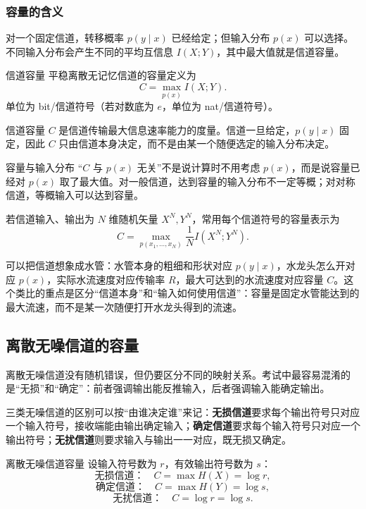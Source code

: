 \subsubsection{容量的含义}
对一个固定信道，转移概率 $p(y\mid x)$ 已经给定；但输入分布 $p(x)$ 可以选择。不同输入分布会产生不同的平均互信息 $I(X;Y)$，其中最大值就是信道容量。

\begin{definitionBox}{信道容量}
平稳离散无记忆信道的容量定义为
\[
C=\max_{p(x)} I(X;Y).
\]
单位为 bit/信道符号（若对数底为 $e$，单位为 nat/信道符号）。
\end{definitionBox}

信道容量 $C$ 是信道传输最大信息速率能力的度量。信道一旦给定，$p(y\mid x)$ 固定，因此 $C$ 只由信道本身决定，而不是由某一个随便选定的输入分布决定。

\begin{warningBox}{容量与输入分布}
“$C$ 与 $p(x)$ 无关”不是说计算时不用考虑 $p(x)$，而是说容量已经对 $p(x)$ 取了最大值。对一般信道，达到容量的输入分布不一定等概；对对称信道，等概输入可以达到容量。
\end{warningBox}

若信道输入、输出为 $N$ 维随机矢量 $X^N,Y^N$，常用每个信道符号的容量表示为
\[
C=\max_{p(x_1,\dots,x_N)}\frac{1}{N}I(X^N;Y^N).
\]

可以把信道想象成水管：水管本身的粗细和形状对应 $p(y\mid x)$，水龙头怎么开对应 $p(x)$，实际水流速度对应传输率 $R$，最大可达到的水流速度对应容量 $C$。这个类比的重点是区分“信道本身”和“输入如何使用信道”：容量是固定水管能达到的最大流速，而不是某一次随便打开水龙头得到的流速。

\subsection{离散无噪信道的容量}

离散无噪信道没有随机错误，但仍要区分不同的映射关系。考试中最容易混淆的是“无损”和“确定”：前者强调输出能反推输入，后者强调输入能确定输出。

三类无噪信道的区别可以按“由谁决定谁”来记：\textbf{无损信道}要求每个输出符号只对应一个输入符号，接收端能由输出确定输入；\textbf{确定信道}要求每个输入符号只对应一个输出符号；\textbf{无扰信道}则要求输入与输出一一对应，既无损又确定。

\begin{formulaBox}{离散无噪信道容量}
设输入符号数为 $r$，有效输出符号数为 $s$：
\[
\text{无损信道：}\quad C=\max H(X)=\log r,
\]
\[
\text{确定信道：}\quad C=\max H(Y)=\log s,
\]
\[
\text{无扰信道：}\quad C=\log r=\log s.
\]
\end{formulaBox}


